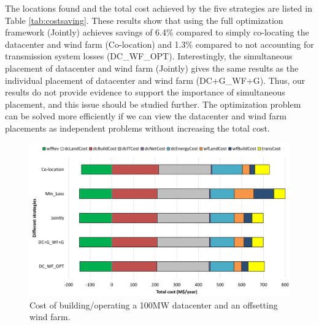 The locations found and the total cost achieved by the five strategies
are listed in Table \ref{tab:costsaving}.  These results show that
using the full optimization framework (Jointly) achieves savings of
6.4\% compared to simply co-locating the datacenter and wind farm
(Co-location) and 1.3\% compared to not accounting for transmission
system losses (DC\_WF\_OPT).  Interestingly, the simultaneous
placement of datacenter and wind farm (Jointly) gives the same results
as the individual placement of datacenter and wind farm (DC+G\_WF+G).
Thus, our results do not provide evidence to support the importance of
simultaneous placement, and this issue should be studied further.  The
optimization problem can be solved more efficiently if we can view the
datacenter and wind farm placements as independent problems without
increasing the total cost.

\begin{figure}[ht]
\centering
\includegraphics[width=1\columnwidth]{img/cost-one-dc-one-wf}
\caption{Cost of building/operating a 100MW datacenter and an offsetting wind farm.}
\label{fig:cost1dc1wf}
\end{figure}

